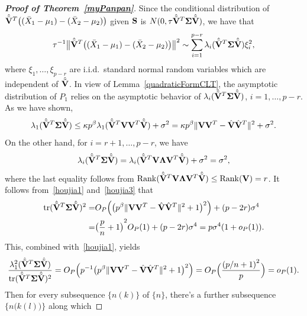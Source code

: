 \documentclass[review]{elsarticle}
\DeclareMathOperator{\mytr}{tr}
\DeclareMathOperator{\myrank}{Rank}
\theoremstyle{plain}
\theoremstyle{definition}
\theoremstyle{remark}
\begin{document}
\begin{appendices}
\begin{proof}[\textbf{Proof of Theorem~\ref{myPanpan}}]
    Since the conditional distribution of
    $\hat{\tilde{\mathbf{V}}}^T\big((\bar{X}_1-\mu_1)-(\bar{X}_2-\mu_2)\big)$ given $\mathbf{S}$ is $N(0,\tau \hat{\tilde{\mathbf{V}}}^T\boldsymbol{\Sigma}\hat{\tilde{\mathbf{V}}})$,
    we have that
\begin{equation}\label{houjia2}
\tau^{-1}\big\|\hat{\tilde{\mathbf{V}}}^T\big((\bar{X}_1-\mu_1)-(\bar{X}_2-\mu_2)\big)\big\|^2
\sim
    \sum_{i=1}^{p-r} \lambda_i(\hat{\tilde{\mathbf{V}}}^T\boldsymbol{\Sigma}\hat{\tilde{\mathbf{V}}})\xi_i^2,
\end{equation}
where $\xi_1,\ldots,\xi_{p-r}$ are i.i.d.\  standard normal random variables which are independent of $\hat{\tilde{\mathbf{V}}}$.
    In view of Lemma~\ref{quadraticFormCLT}, the asymptotic distribution of $P_1$ relies on the asymptotic behavior of $\lambda_i(\hat{\tilde{\mathbf{V}}}^T\boldsymbol{\Sigma}\hat{\tilde{\mathbf{V}}})$, $i=1,\ldots, p-r$.
    As we have shown,
     \begin{equation}\label{houjia1}
     \lambda_1(\hat{\tilde{\mathbf{V}}}^T\boldsymbol{\Sigma}\hat{\tilde{\mathbf{V}}})\leq 
     \kappa p^{\beta}\lambda_1(\hat{\tilde{\mathbf{V}}}^T \mathbf{V} \mathbf{V}^T\hat{\tilde{\mathbf{V}}})+\sigma^2
     =
    \kappa p^\beta \|\mathbf{V}\mathbf{V}^T -\hat{\mathbf{V}}\hat{\mathbf{V}}^T\|^2+\sigma^2.
     \end{equation}
    On the other hand,
    for $i=r+1,\ldots,p-r$,
    we have
    \begin{equation}\label{houjia3}
    \lambda_i(\hat{\tilde{\mathbf{V}}}^T\boldsymbol{\Sigma}\hat{\tilde{\mathbf{V}}})
    =
    \lambda_i(\hat{\tilde{\mathbf{V}}}^T \mathbf{V} \boldsymbol{\Lambda} \mathbf{V}^T \hat{\tilde{\mathbf{V}}})+\sigma^2
    =\sigma^2,
    \end{equation}
where the last equality follows from $\myrank(\hat{\tilde{\BV}}^T \BV \bLambda \BV^T \hat{\tilde{\BV}})\leq \myrank(\BV)=r$.
It follows from~\eqref{houjia1} and~\eqref{houjia3} that
\begin{equation}\label{traceA1}
    \begin{aligned}
        \mytr(\hat{\tilde{\BV}}^T\bSigma\hat{\tilde{\BV}})^2=&
    O_P\Big(\big(p^{\beta}\|\BV\BV^T-\hat{\BV}\hat{\BV}^T\|^2+1\big)^2\Big)
    +
    (p-2r)\sigma^4\\
    =&
    {\big(\frac{p}{n}+1\big)}^2O_P(1)
    +
    (p-2r)\sigma^4
    =p\sigma^4(1+o_P(1)).
    \end{aligned}
\end{equation}
This, combined with~\eqref{houjia1}, yields
$$
\frac{\lambda_1^2(\hat{\tilde{\BV}}^T\bSigma\hat{\tilde{\BV}})}{\mytr(\hat{\tilde{\BV}}^T\bSigma\hat{\tilde{\BV}})^2}
=O_P\Big(p^{-1}\big(p^{\beta}\|\BV\BV^T-\hat{\BV}\hat{\BV}^T\|^2+1\big)^2\Big)
        =O_P\Big(\frac{{(p/n+1)}^2}{p}\Big)=o_P(1).
$$
Then for every subsequence $\{n(k)\}$ of $\{n\}$, there's a further subsequence $\big\{n\big(k(l)\big)\big\}$ along which

\end{proof}
\end{appendices}
\end{document}
